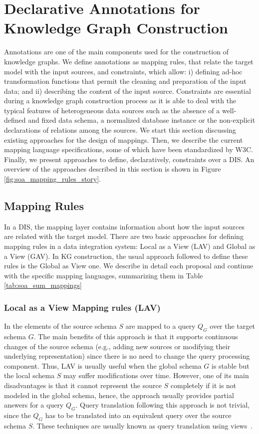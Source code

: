 \section{Declarative Annotations for Knowledge Graph Construction}
\label{sec:soa_annotations}
Annotations are one of the main components used for the construction of knowledge graphs. We define annotations as mapping rules, that relate the target model with the input sources, and constraints, which allow: i) defining ad-hoc transformation functions that permit the cleaning and preparation of the input data; and ii) describing the content of the input source. Constraints are essential during a knowledge graph construction process as it is able to deal with the typical features of heterogeneous data sources such as the absence of a well-defined and fixed data schema, a normalized database instance or the non-explicit declarations of relations among the sources. We start this section discussing existing approaches for the design of mappings. Then, we describe the current mapping language specifications, some of which have been standardized by W3C. Finally, we present approaches to define, declaratively, constraints over a DIS. An overview of the approaches described in this section is shown in Figure \ref{fig:soa_mapping_rules_story}.

\subsection{Mapping Rules}
In a DIS, the mapping layer contains information about how the input sources are related with the target model. There are two basic approaches for defining mapping rules in a data integration system: Local as a View (LAV) and Global as a View (GAV). In KG construction, the usual approach followed to define these rules is the Global as View one. We describe in detail each proposal and continue with the specific mapping languages, summarizing them in Table \ref{tab:soa_sum_mappings}

\subsubsection{Local as a View Mapping rules (LAV)}
In \citep{ullman1997information} the elements of the source schema $S$ are mapped  to a query $Q_G$ over the target schema $G$. The main benefits of this approach is that it supports continuous changes of the source schema (e.g., adding new sources or modifying their underlying representation) since there is no need to change the query processing component. Thus, LAV is usually useful when the global schema $G$ is stable but the local schema $S$ may suffer modifications over time. However, one of its main disadvantages is that it cannot represent the source $S$ completely if it is not modeled in the global schema, hence, the approach usually provides partial answers for a query $Q_G$. Query translation following this approach is not trivial, since the $Q_G$ has to be translated into an equivalent query over the source schema $S$. These techniques are usually known as query translation using views~\citep{halevy2001answering}.

